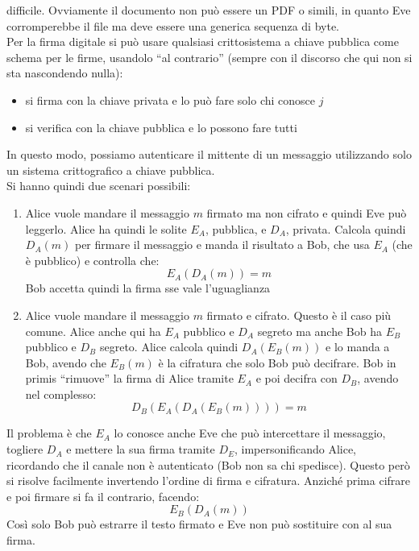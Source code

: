 \documentclass[a4paper,12pt, oneside]{book}
\begin{document}
difficile. Ovviamente il documento non può essere un PDF o simili, in quanto Eve
corromperebbe il file ma deve essere una generica sequenza di byte.\\
Per la firma digitale si può usare qualsiasi crittosistema a chiave pubblica
come schema per le firme, usandolo ``al contrario'' (sempre con il discorso che
qui non si sta nascondendo nulla):
\begin{itemize}
  \item si firma con la chiave privata e lo può fare solo chi conosce $j$
  \item si verifica con la chiave pubblica e lo possono fare tutti
\end{itemize}
In questo modo, possiamo autenticare il mittente di un messaggio utilizzando
solo un sistema crittografico a chiave pubblica.\\
Si hanno quindi due scenari possibili:
\begin{enumerate}
  \item Alice vuole mandare il messaggio $m$ firmato ma non cifrato e quindi Eve
  può leggerlo. Alice ha quindi le solite $E_A$, pubblica, e $D_A$,
  privata. Calcola quindi $D_A(m)$ per firmare il messaggio e manda il risultato
  a Bob, che usa $E_A$ (che è pubblico) e controlla che:
  \[E_A(D_A(m))=m\]
  Bob accetta quindi la firma sse vale l'uguaglianza
  \item Alice vuole mandare il messaggio $m$ firmato e cifrato. Questo è il caso
  più comune. Alice anche qui ha $E_A$ pubblico e $D_A$ segreto ma anche Bob ha
  $E_B$ pubblico e $D_B$ segreto. Alice calcola quindi $D_A(E_B(m))$ e lo manda
  a Bob, avendo che $E_B(m)$ è la cifratura che solo Bob può decifrare. Bob in
  primis ``rimuove'' la firma di Alice tramite $E_A$ e poi decifra con $D_B$,
  avendo nel complesso:
  \[D_B(E_A(D_A(E_B(m))))=m\]
\end{enumerate}
Il problema è che $E_A$ lo conosce anche Eve che può intercettare il messaggio,
togliere $D_A$ e mettere la sua firma tramite $D_E$, impersonificando Alice,
ricordando che il canale non è autenticato (Bob non sa chi spedisce). Questo
però si risolve facilmente invertendo l'ordine di firma e cifratura. Anziché
prima cifrare e poi firmare si fa il contrario, facendo:
\[E_B(D_A(m))\]
Così solo Bob può estrarre il testo firmato e Eve non può sostituire con al sua
firma.
\end{document}
